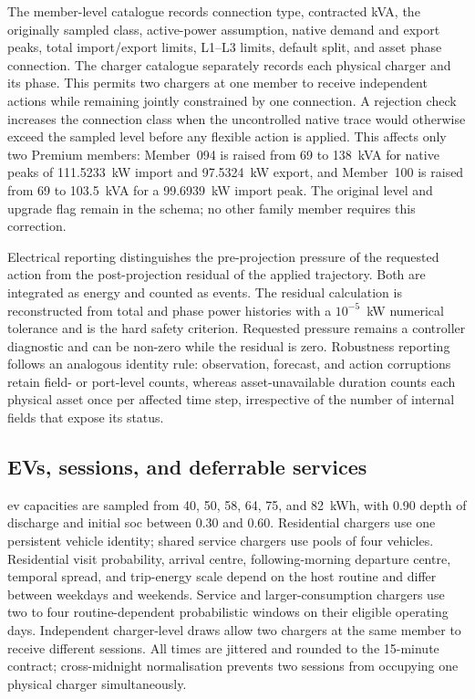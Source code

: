 The member-level catalogue records connection type, contracted kVA, the originally sampled class, active-power assumption, native demand and export peaks, total import/export limits, L1--L3 limits, default split, and asset phase connection. The charger catalogue separately records each physical charger and its phase. This permits two chargers at one member to receive independent actions while remaining jointly constrained by one connection. A rejection check increases the connection class when the uncontrolled native trace would otherwise exceed the sampled level before any flexible action is applied. This affects only two Premium members: Member~094 is raised from 69 to 138~kVA for native peaks of 111.5233~kW import and 97.5324~kW export, and Member~100 is raised from 69 to 103.5~kVA for a 99.6939~kW import peak. The original level and upgrade flag remain in the schema; no other family member requires this correction.

Electrical reporting distinguishes the pre-projection pressure of the requested action from the post-projection residual of the applied trajectory. Both are integrated as energy and counted as events. The residual calculation is reconstructed from total and phase power histories with a $10^{-5}$~kW numerical tolerance and is the hard safety criterion. Requested pressure remains a controller diagnostic and can be non-zero while the residual is zero. Robustness reporting follows an analogous identity rule: observation, forecast, and action corruptions retain field- or port-level counts, whereas asset-unavailable duration counts each physical asset once per affected time step, irrespective of the number of internal fields that expose its status.

\subsection{EVs, sessions, and deferrable services}

\gls{ev} capacities are sampled from 40, 50, 58, 64, 75, and 82~kWh, with 0.90 depth of discharge and initial \gls{soc} between 0.30 and 0.60. Residential chargers use one persistent vehicle identity; shared service chargers use pools of four vehicles. Residential visit probability, arrival centre, following-morning departure centre, temporal spread, and trip-energy scale depend on the host routine and differ between weekdays and weekends. Service and larger-consumption chargers use two to four routine-dependent probabilistic windows on their eligible operating days. Independent charger-level draws allow two chargers at the same member to receive different sessions. All times are jittered and rounded to the 15-minute contract; cross-midnight normalisation prevents two sessions from occupying one physical charger simultaneously.

